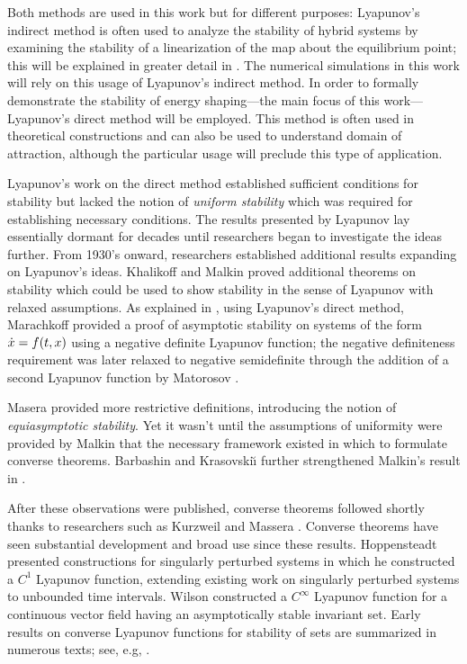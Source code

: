 Both methods are used in this work but for different purposes:
%
Lyapunov's indirect method is often used to analyze the stability of hybrid
systems by examining the stability of a linearization of the \Poincare{} map
about the equilibrium point; this will be explained in greater detail in
.
%
The numerical simulations in this work will rely on this usage of Lyapunov's
indirect method.
%
In order to formally demonstrate the stability of energy shaping---the main
focus of this work---Lyapunov's direct method will be employed.
%
This method is often used in theoretical constructions and can also be used to
understand domain of attraction, although the particular usage will preclude
this type of application.

Lyapunov's work on the direct method established sufficient conditions for
stability but lacked the notion of {\em uniform stability} which was required
for establishing necessary conditions.
%
The results presented by Lyapunov lay essentially dormant for decades until
researchers began to investigate the ideas further.
%
From 1930's onward, researchers established additional results expanding on
Lyapunov's ideas.
%
Khalikoff \cite{Khalikoff1937} and Malkin \cite{Malkin1938} proved additional
theorems on stability which could be used to show stability in the sense of
Lyapunov with relaxed assumptions.
%
As explained in \cite{Murakami1988}, using Lyapunov's direct method, Marachkoff
\cite{Marachkoff1940} provided a proof of asymptotic stability on systems of the
form ${\dot {x}} = f(t, x)$ using a negative definite Lyapunov function;
%
the negative definiteness requirement was later relaxed to negative semidefinite
through the addition of a second Lyapunov function by Matorosov
\cite{Matorosov1962}.
%

%
Masera \cite{Massera1949} provided more restrictive definitions, introducing the
notion of {\em equiasymptotic stability}.
%
Yet it wasn't until the assumptions of uniformity were provided by Malkin
\cite{Malkin1954} that the necessary framework existed in which to formulate
converse theorems.
%
Barbashin and Krasovski\u{\i} further strengthened Malkin's result in
\cite{Barbashin1954}.
%

After these observations were published, converse theorems followed shortly
thanks to researchers such as Kurzweil \cite{Kurzweil1956} and Massera
\cite{Massera1956}.
%
Converse theorems have seen substantial development and broad use since these
results.
%
Hoppensteadt \cite{Hoppensteadt1966} presented constructions for singularly
perturbed systems in which he constructed a $C^{1}$ Lyapunov function, extending
existing work on singularly perturbed systems to unbounded time intervals.
%
Wilson \cite{Wilson1969} constructed a $C^{\infty}$ Lyapunov function for a
continuous vector field having an asymptotically stable invariant set.
%
Early results on converse Lyapunov functions for stability of sets are
summarized in numerous texts; see, e.g, \cite{Antosiewicz1958}.

